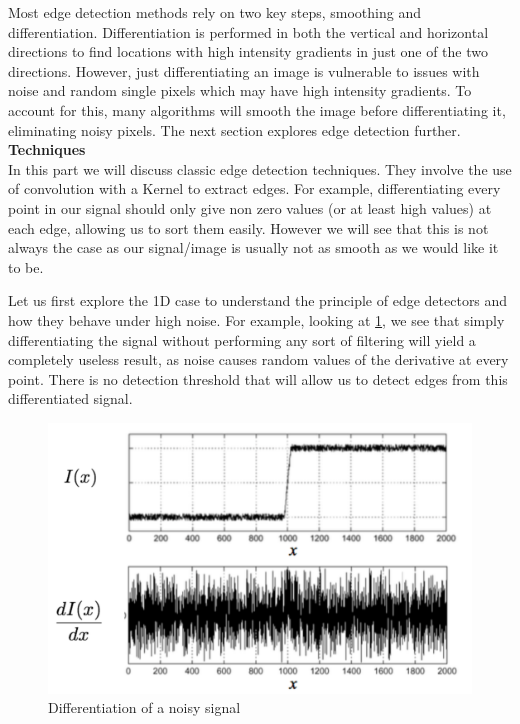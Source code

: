 \documentclass[twoside]{article}
\begin{document}
Most edge detection methods rely on two key steps, smoothing and differentiation. Differentiation is performed in both the vertical and horizontal directions to find locations with high intensity gradients in just one of the two directions. However, just differentiating an image is vulnerable to issues with noise and random single pixels which may have high intensity gradients. To account for this, many algorithms will smooth the image before differentiating it, eliminating noisy pixels. The next section explores edge detection further. \\

\textbf{Techniques}\\
In this part we will discuss classic edge detection techniques. They involve the use of convolution with a Kernel to extract edges. For example, differentiating every point in our signal should only give non zero values (or at least high values) at each edge, allowing us to sort them easily. However we will see that this is not always the case as our signal/image is usually not as smooth as we would like it to be.

Let us first explore the 1D case to understand the principle of edge detectors and how they behave under high noise. For example, looking at \ref{noisy}, we see that simply differentiating the signal without performing any sort of filtering will yield a completely useless result, as noise causes random values of the derivative at every point. There is no detection threshold that will allow us to detect edges from this differentiated signal.

\begin{figure}[h]
	\centering
	\includegraphics[scale=.4]{noisy_uncorrected.PNG}
    \caption{Differentiation of a noisy signal}
    \label{noisy}
\end{figure}
\end{document}
